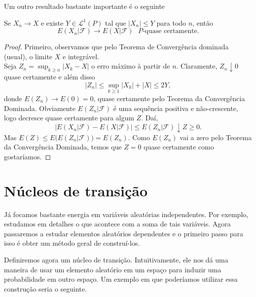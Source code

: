 Um outro resultado bastante importante é o seguinte

\begin{theorem}
  Se $X_n \to X$ e existe $Y \in \mathcal{L}^1(P)$ tal que $|X_n| \leq Y$ para todo $n$, então
  \begin{equation}
    E(X_n | \mathcal{F}) \to E(X|\mathcal{F}) \text{ $P$-quase certamente.}
  \end{equation}
\end{theorem}

\begin{proof}
Primeiro, observamos que pelo Teorema de Convergência dominada (usual), o limite $X$ e integrável.\\


  Seja $Z_n = \sup_{k \geq n} |X_k - X|$ o erro máximo à partir de $n$.
  Claramente, $Z_n \downarrow 0$ quase certamente e além disso
  \begin{equation}
    |Z_n| \leq \sup_{k \geq 1} |X_k| + |X| \leq 2 Y,
  \end{equation}
  donde $E(Z_n) \to E(0) = 0$, quase certamente pelo Teorema da Convergência Dominada.
Obviamente $E(Z_n|\mathcal{F})$ é uma sequência positiva e não-crescente, logo decresce quase certamente para algum $Z$.
  Daí,
  \begin{equation}
    \big| E(X_n | \mathcal{F}) - E(X | \mathcal{F}) \big| \leq E(Z_n | \mathcal{F}) \downarrow Z \geq 0.
  \end{equation}
  Mas $E(Z) \leq E\big( E(Z_n|\mathcal{F}) \big) = E(Z_n)$.
  Como $E(Z_n)$ vai a zero pelo Teorema da Convergência Dominada, temos que $Z = 0$ quase certamente como gostaríamos.
\end{proof}

\section{Núcleos de transição}

Já focamos bastante energia em variáveis aleatórias independentes.
Por exemplo, estudamos em detalhes o que acontece com a soma de tais variáveis.
Agora passaremos a estudar elementos aleatórios dependentes e o primeiro passo para isso é obter um método geral de construí-los.

Definiremos agora um núcleo de transição.
Intuitivamente, ele nos dá uma maneira de usar um elemento aleatório em um espaço para induzir uma probabilidade em outro espaço.
Um exemplo em que poderíamos utilizar essa construção seria o seguinte.

